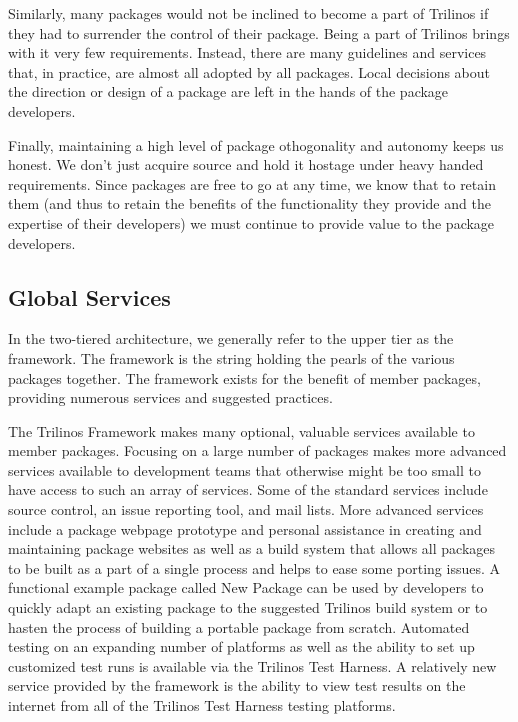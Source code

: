 \documentclass[12pt,relax]{article}
\begin{document}
Similarly, many packages would not be inclined to become a part of Trilinos
if they had to surrender the control of their package.  Being a part of
Trilinos brings with it very few requirements.  Instead, there are many
guidelines and services that, in practice, are almost all adopted by all
packages.  Local decisions about the direction or design of a package are
left in the hands of the package developers.

Finally, maintaining a high level of package othogonality and autonomy
keeps us honest.  We don't just acquire source and hold it hostage under heavy
handed requirements.  Since packages are free to go at any time, we know that
to retain them (and thus to retain the benefits of the functionality they
provide and the expertise of their developers) we must continue to provide
value to the package developers.

\subsection{Global Services}

In the two-tiered architecture, we generally refer to the upper tier as the
framework.  The framework is the string holding the pearls of the various
packages together.  The framework exists for the benefit of member
packages, providing numerous services and suggested practices.

The Trilinos Framework makes many optional, valuable services available to
member packages.  Focusing on a large number of packages makes more advanced
services available to development teams that otherwise might be too
small to have access to such an array of services.  Some of the standard
services include source control, an issue reporting tool, and mail lists.
More advanced services include a package webpage prototype and personal 
assistance in creating and maintaining package websites as well as a build 
system that allows all packages to be built as a part of a single process 
and helps to ease some porting issues.  A functional example package called
New Package can be used by developers to quickly adapt an existing package 
to the suggested Trilinos build system or to hasten the process of 
building a portable package from scratch.  Automated testing on an expanding 
number of platforms as well as the ability to set up customized test runs is 
available via the Trilinos Test Harness.  A relatively new service provided 
by  the framework is the ability to view test results on the internet from
all of the Trilinos Test Harness testing platforms.
\end{document}
